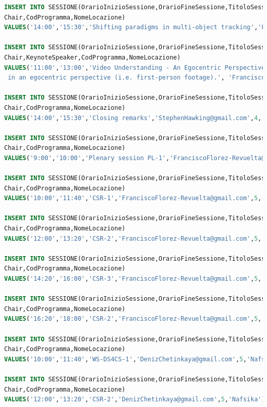 \documentclass[a4page]{article}
\begin{document}
\begin{lstlisting}[language=SQL,
        deletekeywords={IDENTITY,INT},
        morekeywords={clustered},    
        framesep=10pt,
        framextopmargin=10pt]
INSERT INTO SESSIONE(OrarioInizioSessione,OrarioFineSessione,TitoloSessione,
Chair,CodProgramma,NomeLocazione)
VALUES('14:00','15:30','Shifting paradigms in multi-object tracking','FranciscoFlorez-Revuelta@gmail.com',3,'Sala Museo della Stampa');

INSERT INTO SESSIONE(OrarioInizioSessione,OrarioFineSessione,TitoloSessione,DescrizioneSessione,
Chair,KeynoteSpeaker,CodProgramma,NomeLocazione)
VALUES('11:00','13:00','Video Understanding - An Egocentric Perspective','This talk aims to argue for a fine(r)-grained perspective onto human-object interactions, from video sequences, captured 
 in an egocentric perspective (i.e. first-person footage).', 'FranciscoFlorez-Revuelta@gmail.com','NicolaLerme@unipa.it',4,'Sala d''arte (First floor)');

INSERT INTO SESSIONE(OrarioInizioSessione,OrarioFineSessione,TitoloSessione,
Chair,CodProgramma,NomeLocazione)
VALUES('14:00','15:30','Closing remarks','StephenHawking@gmail.com',4,'Sala Museo della Stampa');

INSERT INTO SESSIONE(OrarioInizioSessione,OrarioFineSessione,TitoloSessione,
Chair,CodProgramma,NomeLocazione)
VALUES('9:00','10:00','Plenary session PL-1','FranciscoFlorez-Revuelta@gmail.com',5,'Athena');

INSERT INTO SESSIONE(OrarioInizioSessione,OrarioFineSessione,TitoloSessione,
Chair,CodProgramma,NomeLocazione)
VALUES('10:00','11:40','CSR-1','FranciscoFlorez-Revuelta@gmail.com',5,'Athena');

INSERT INTO SESSIONE(OrarioInizioSessione,OrarioFineSessione,TitoloSessione,
Chair,CodProgramma,NomeLocazione)
VALUES('12:00','13:20','CSR-2','FranciscoFlorez-Revuelta@gmail.com',5,'Athena');

INSERT INTO SESSIONE(OrarioInizioSessione,OrarioFineSessione,TitoloSessione,
Chair,CodProgramma,NomeLocazione)
VALUES('14:20','16:00','CSR-3','FranciscoFlorez-Revuelta@gmail.com',5,'Athena');

INSERT INTO SESSIONE(OrarioInizioSessione,OrarioFineSessione,TitoloSessione,
Chair,CodProgramma,NomeLocazione)
VALUES('16:20','18:00','CSR-2','FranciscoFlorez-Revuelta@gmail.com',5,'Athena');

INSERT INTO SESSIONE(OrarioInizioSessione,OrarioFineSessione,TitoloSessione,
Chair,CodProgramma,NomeLocazione)
VALUES('10:00','11:40','WS-DS4CS-1','DenizChetinkaya@gmail.com',5,'Nafsika');

INSERT INTO SESSIONE(OrarioInizioSessione,OrarioFineSessione,TitoloSessione,
Chair,CodProgramma,NomeLocazione)
VALUES('12:00','13:20','CSR-2','DenizChetinkaya@gmail.com',5,'Nafsika');


\end{lstlisting}
\end{document}
